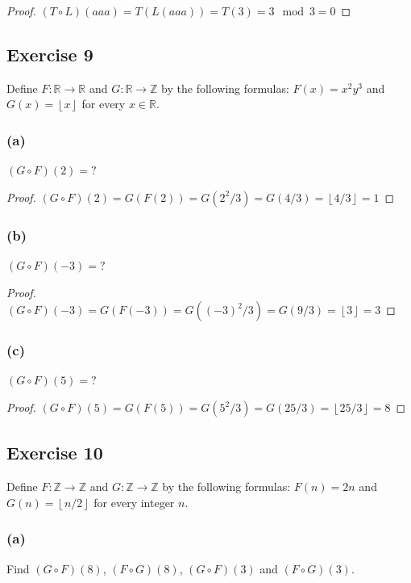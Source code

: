 \documentclass[14pt]{extarticle}
\newcommand{\R}{\mathbb{R}}
\newcommand{\Z}{\mathbb{Z}}
\newcommand{\floor}[1]{{\left\lfloor#1\right\rfloor}}
\begin{document}
\begin{proof}
\((T \circ L)(aaa) = T(L(aaa)) = T(3) = 3 \mod 3 = 0\)
\end{proof}

\subsection{Exercise 9}
Define \(F: \R \to \R\) and \(G: \R \to \Z\) by the following formulas: \(F(x) = x^2y^3\) and 
\(G(x) = \floor{x}\) for every \(x \in \R\).

\subsubsection{(a)}
\((G \circ F)(2) = ?\)

\begin{proof}
\((G \circ F)(2) = G(F(2)) = G(2^2/3) = G(4/3) = \floor{4/3} = 1\)
\end{proof}

\subsubsection{(b)}
\((G \circ F)(-3) = ?\)

\begin{proof}
\((G \circ F)(-3) = G(F(-3)) = G((-3)^2/3) = G(9/3) = \floor{3} = 3\)
\end{proof}

\subsubsection{(c)}
\((G \circ F)(5) = ?\)

\begin{proof}
\((G \circ F)(5) = G(F(5)) = G(5^2/3) = G(25/3) = \floor{25/3} = 8\)
\end{proof}

\subsection{Exercise 10}
Define \(F: \Z \to \Z\) and \(G: \Z \to \Z\) by the following formulas: \(F(n) = 2n\) and \(G(n)=\floor{n/2}\) 
for every integer $n$.

\subsubsection{(a)}
Find \((G \circ F)(8)\), \((F \circ G)(8)\), \((G \circ F)(3)\) and \((F \circ G)(3)\).
\end{document}
